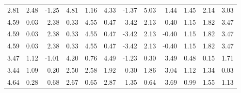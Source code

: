 \documentclass{article}
\begin{document}
\begin{tabular}{rrrrrrrrrrrr}
	2.81 &     2.48 &    -1.25 &     4.81  &     1.16 &     4.33 &    -1.37 &     5.03 &     1.44 &     1.45  &     2.14 &     3.03  \\ 
	4.59 &     0.03 &     2.38 &     0.33  &     4.55 &     0.47 &    -3.42 &     2.13 &    -0.40 &     1.15  &     1.82 &     3.47  \\ 
	4.59 &     0.03 &     2.38 &     0.33  &     4.55 &     0.47 &    -3.42 &     2.13 &    -0.40 &     1.15  &     1.82 &     3.47  \\ 
	4.59 &     0.03 &     2.38 &     0.33  &     4.55 &     0.47 &    -3.42 &     2.13 &    -0.40 &     1.15  &     1.82 &     3.47  \\ 
	3.47 &     1.12 &    -1.01 &     4.20  &     0.76 &     4.49 &    -1.23 &     0.30 &     3.49 &     0.48  &     0.15 &     1.71  \\ 
	3.44 &     1.09 &     0.20 &     2.50  &     2.58 &     1.92 &     0.30 &     1.86 &     3.04 &     1.12  &     1.34 &     0.03  \\ 
	4.64 &     0.28 &     0.68 &     2.67  &     0.65 &     2.87 &     1.35 &     0.64 &     3.69 &     0.99  &     1.55 &     1.13  \\ \hline 
\end{tabular}
\end{document}
